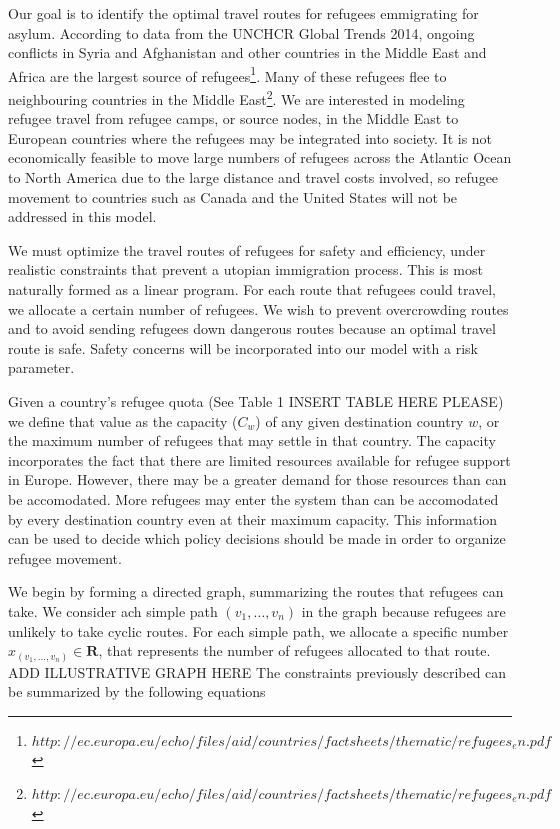\documentclass{article}
\begin{document}
Our goal is to identify the optimal travel routes for refugees emmigrating for asylum. According to data from the UNCHCR Global Trends 2014, ongoing conflicts in Syria and Afghanistan and other countries in the Middle East and Africa are the largest source of refugees\footnote{$http://ec.europa.eu/echo/files/aid/countries/factsheets/thematic/refugees_en.pdf$}. Many of these refugees flee to neighbouring countries in the Middle East\footnote{$http://ec.europa.eu/echo/files/aid/countries/factsheets/thematic/refugees_en.pdf$}. We are interested in modeling refugee travel from refugee camps, or source nodes, in the Middle East to European countries where the refugees may be integrated into society. It is not economically feasible to move large numbers of refugees across the Atlantic Ocean to North America due to the large distance and travel costs involved, so refugee movement to countries such as Canada and the United States will not be addressed in this model. 

We must optimize the travel routes of refugees for safety and efficiency, under realistic constraints that prevent a utopian immigration process. This is most naturally formed as a linear program. For each route that refugees could travel, we allocate a certain number of refugees. We wish to prevent overcrowding routes and to avoid sending refugees down dangerous routes because an optimal travel route is safe. Safety concerns will be incorporated into our model with a risk parameter. 

Given a country's refugee quota (See Table 1 INSERT TABLE HERE PLEASE) we define that value as the capacity ($C_w$) of any given destination country $w$, or the maximum number of refugees that may settle in that country. The capacity incorporates the fact that there are limited resources available for refugee support in Europe. However, there may be a greater demand for those resources than can be accomodated. More refugees may enter the system than can be accomodated by every destination country even at their maximum capacity. This information can be used to decide which policy decisions should be made in order to organize refugee movement.

We begin by forming a directed graph, summarizing the routes that refugees can take. We consider ach simple path $(v_1, \dots, v_n)$ in the graph because refugees are unlikely to take cyclic routes. For each simple path, we allocate a specific number $x_{(v_1, \dots, v_n)} \in \mathbf{R}$, that represents the number of refugees allocated to that route. ADD ILLUSTRATIVE GRAPH HERE The constraints previously described can be summarized by the following equations
\end{document}
